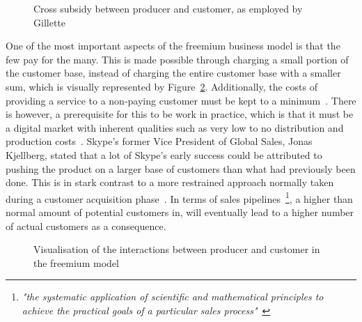 \begin{figure}
    \centering
    \caption{Cross subsidy between producer and customer, as employed by Gillette~\cite{chrisanderson2008}}
    \label{fig:gillette}
\end{figure}


One of the most important aspects of the freemium business model is that the few pay for the many. This is made possible through charging a small portion of the customer base, instead of charging the entire customer base with a smaller sum, which is visually represented by Figure~\ref{fig:freemium}. Additionally, the costs of providing a service to a non-paying customer must be kept to a minimum~\cite{chrisanderson2008feb}. There is however, a prerequisite for this to be work in practice, which is that it must be a digital market with inherent qualities such as very low to no distribution and production costs~\cite{chrisanderson2008}. Skype's former Vice President of Global Sales, Jonas Kjellberg, stated that a lot of Skype's early success could be attributed to pushing the product on a larger base of customers than what had previously been done. This is in stark contrast to a more restrained approach normally taken during a customer acquisition phase~\cite{jonaskjellberg2014}. In terms of sales pipelines~\footnote{\textit{"the systematic application of scientific and mathematical principles to achieve the practical goals of a particular sales process"}~\cite{selden1996}}, a higher than normal amount of potential customers in, will eventually lead to a higher number of actual customers as a consequence.

\begin{figure}
    \centering
    \caption{Visualisation of the interactions between producer and customer in the freemium model~\cite{chrisanderson2008}}
    \label{fig:freemium}
\end{figure}

